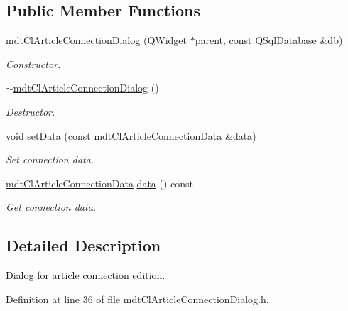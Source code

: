 \subsection*{Public Member Functions}
\begin{DoxyCompactItemize}
\item 
\hyperlink{classmdt_cl_article_connection_dialog_abc1ee29dfcae7f653a4969636014a354}{mdt\-Cl\-Article\-Connection\-Dialog} (\hyperlink{class_q_widget}{Q\-Widget} $\ast$parent, const \hyperlink{class_q_sql_database}{Q\-Sql\-Database} \&db)
\begin{DoxyCompactList}\small\item\em Constructor. \end{DoxyCompactList}\item 
\hyperlink{classmdt_cl_article_connection_dialog_acc899bf48e5f7637d9a04e57553fd718}{$\sim$mdt\-Cl\-Article\-Connection\-Dialog} ()
\begin{DoxyCompactList}\small\item\em Destructor. \end{DoxyCompactList}\item 
void \hyperlink{classmdt_cl_article_connection_dialog_a2cccdff30a974a2bfb71c8603484f00b}{set\-Data} (const \hyperlink{classmdt_cl_article_connection_data}{mdt\-Cl\-Article\-Connection\-Data} \&\hyperlink{classmdt_cl_article_connection_dialog_a116043b66b6d34281ee7200834a97903}{data})
\begin{DoxyCompactList}\small\item\em Set connection data. \end{DoxyCompactList}\item 
\hyperlink{classmdt_cl_article_connection_data}{mdt\-Cl\-Article\-Connection\-Data} \hyperlink{classmdt_cl_article_connection_dialog_a116043b66b6d34281ee7200834a97903}{data} () const 
\begin{DoxyCompactList}\small\item\em Get connection data. \end{DoxyCompactList}\end{DoxyCompactItemize}


\subsection{Detailed Description}
Dialog for article connection edition. 

Definition at line 36 of file mdt\-Cl\-Article\-Connection\-Dialog.\-h.



